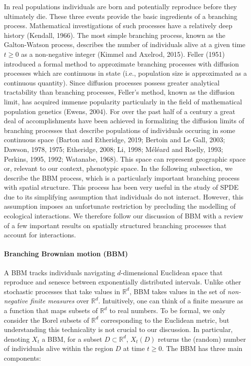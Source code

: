 \documentclass[]{elsarticle} %
\begin{document}
In real populations individuals are born and potentially reproduce
before they ultimately die. These three events provide the basic
ingredients of a branching process. Mathematical investigations of such
processes have a relatively deep history (Kendall, 1966). The most
simple branching process, known as the Galton-Watson process, describes
the number of individuals alive at a given time \(t\geq0\) as a
non-negative integer (Kimmel and Axelrod, 2015). Feller (1951)
introduced a formal method to approximate branching processes with
diffusion processes which are continuous in state (i.e., population size
is approximated as a continuous quantity). Since diffusion processes
possess greater analytical tractability than branching processes,
Feller's method, known as the diffusion limit, has acquired immense
popularity particularly in the field of mathematical population genetics
(Ewens, 2004). For over the past half of a century a great deal of
accomplishments have been achieved in formalizing the diffusion limits
of branching processes that describe populations of individuals occuring
in some continuous space (Barton and Etheridge, 2019; Bertoin and Le
Gall, 2003; Dawson, 1978, 1975; Etheridge, 2008; Li, 1998; Méléard and
Roelly, 1993; Perkins, 1995, 1992; Watanabe, 1968). This space can
represent geographic space or, relevant to our context, phenotypic
space. In the following subsection, we describe the BBM process, which
is a particularly important branching process with spatial structure.
This process has been very useful in the study of SPDE due to its
simplifying assumption that individuals do not interact. However, this
assumption imposes an unfortunate restriction by precluding the
modelling of ecological interactions. We therefore follow our discussion
of BBM with a review of a few important results on spatially structured
branching processes that account for interactions.

\paragraph{Branching Brownian motion (BBM)}

A BBM tracks individuals navigating \(d\)-dimensional Euclidean space
that reproduce and senesce between exponentially distributed intervals.
Unlike other stochastic processes that take values in \(\mathbb{R}^d\),
BBM takes values in the set of \emph{non-negative finite measures} over
\(\mathbb{R}^d\). Intuitively, one can think of a finite measure as a
function that maps subsets of \(\mathbb{R}^d\) to real numbers. To be
formal, we only consider the Borel subsets of \(\mathbb{R}^d\)
corresponding to the Euclidean metric, but understanding this
technicality is not crucial to our discussion. In particular, denoting
\(X_t\) a BBM, for a subset \(D\subset\mathbb{R}^d\), \(X_t(D)\) returns
the (random) number of individuals alive within the region \(D\) at time
\(t\geq0\). The BBM has three main components:
\end{document}
